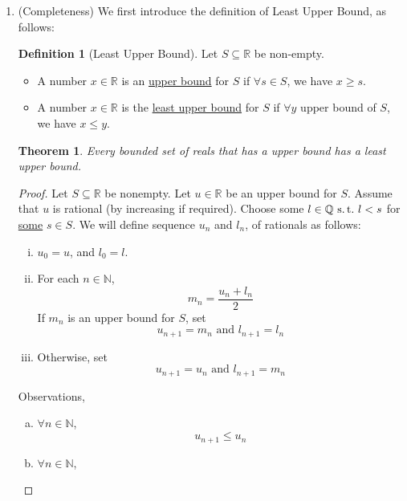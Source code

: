 \documentclass[12pt]{amsart}
\newcommand{\bbR}{\mathbb{R}}
\newcommand{\bbN}{\mathbb{N}}
\newcommand{\bbQ}{\mathbb{Q}}
\newcommand{\suchthat}{\operatorname{\thinspace s.t. \thinspace}}
\theoremstyle{plain}
\newtheorem*{thm}{Theorem}
\theoremstyle{remark}
\theoremstyle{definition}
\newtheorem*{define}{Definition}
\begin{document}
\begin{enumerate}[(1)]
		\item (Completeness)
			We first introduce the definition of Least Upper Bound, as follows: 
			\begin{define}[Least Upper Bound]
				Let $S \subseteq \bbR$ be non-empty. 
				\begin{itemize}[ ]
					\item A number $x\in \bbR$ is an \ul{upper bound} for $S$ if $\forall s\in S$, we have $x \geqslant s$.
					\item A number $x\in \bbR$ is the \ul{least upper bound} for $S$ if $\forall y$ upper bound of $S$, we have $x \leqslant y$.
				\end{itemize}
			\end{define}
		\begin{thm}
			Every bounded set of reals that has a upper bound has a least upper bound.
		\end{thm}
		\begin{proof}
			Let $S \subseteq \bbR$ be nonempty. Let $u\in \bbR$ be an upper bound for $S$. Assume that $u$ is rational (by increasing if required). Choose some $l \in \bbQ \suchthat l < s$ for \ul{some} $s \in S$. We will define sequence $u_n$ and $l_n$, of rationals as follows:
			\begin{enumerate}[(i)]
				\item 
					$u_0 = u$, and $l_0 = l$.
				\item
					For each $n \in \bbN$, 
					\begin{equation*}
						m_n = \frac{u_n + l_n}{2} 
					\end{equation*}
					If $m_n$ is an upper bound for $S$, set
					\begin{equation*}
						u_{n+1} = m_n \mbox{ and } l_{n+1} = l_n
					\end{equation*}
				\item
					Otherwise, set 
					\begin{equation*}
						u_{n+1} = u_n \mbox{ and } l_{n+1} = m_n
					\end{equation*}
			\end{enumerate}
			Observations,
			\begin{enumerate}[(a)]
				\item 
					$\forall n \in \bbN$,
					\begin{equation*}
						u_{n+1} \leqslant u_n
					\end{equation*}
				\item
					$\forall n \in \bbN$,
					\begin{equation*}

\end{equation*}
\end{enumerate}
\end{proof}
\end{enumerate}
\end{document}
